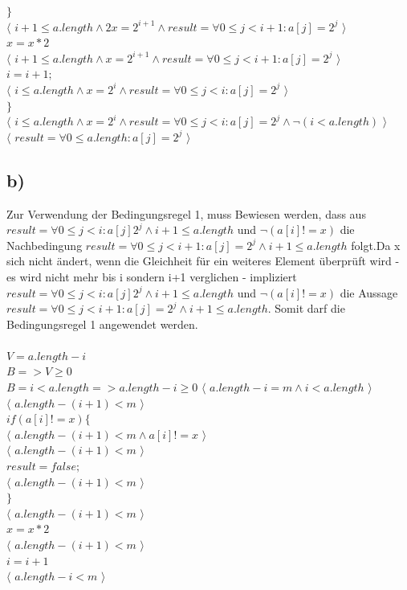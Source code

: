 \documentclass[a4paper]{article}
\begin{document}
$\}$\\
$\langle$ $i + 1 \leq a.length \land 2x=2^{i + 1} \land result = \forall 0 \leq j < i + 1: a[j] = 2^j$ $\rangle$\\
$x = x * 2$\\
$\langle$ $i + 1 \leq a.length \land x=2^{i + 1} \land result = \forall 0 \leq j < i + 1: a[j] = 2^j$ $\rangle$\\
$i = i + 1;$ \\
$\langle$ $i \leq a.length \land x=2^{i} \land result = \forall 0 \leq j < i: a[j] = 2^j$ $\rangle$\\
$\}$\\
$\langle$ $i \leq a.length \land x=2^{i} \land result = \forall 0 \leq j < i: a[j] = 2^j \land \neg (i < a.length)$ $\rangle$\\
$\langle$ $result = \forall 0 \leq a.length : a[j] = 2^j $ $\rangle$\\

\subsection*{b)}

Zur Verwendung der Bedingungsregel 1, muss Bewiesen werden, dass aus $result = \forall 0\leq j < i:a[j]2^j\land i + 1 \leq a.length$ und $\neg(a[i]!=x)$ die Nachbedingung $result = \forall 0 \leq j < i+1:a[j]=2^j\land i + 1 \leq a.length$ folgt.Da x sich nicht ändert, wenn die Gleichheit für ein weiteres Element überprüft wird - es wird nicht mehr bis i sondern i+1 verglichen - impliziert $result = \forall 0\leq j < i:a[j]2^j\land i + 1 \leq a.length$ und $\neg(a[i]!=x)$ die Aussage $result = \forall 0 \leq j < i+1:a[j]=2^j\land i + 1 \leq a.length$. Somit darf die Bedingungsregel 1 angewendet werden. \\\\
$V=a.length-i$\\
$B=>V\geq0$\\
$B=i<a.length => a.length-i \geq 0$
$\langle$ $a.length-i=m \land i<a.length$ $\rangle$\\
$\langle$ $a.length-(i+1) < m$ $\rangle$\\
$if(a[i]!=x)\{$\\
$\langle$ $a.length-(i+1)<m\land a[i]!=x$ $\rangle$\\
$\langle$ $a.length-(i+1)<m$ $\rangle$\\
$result = false;$\\
$\langle$ $a.length-(i+1)<m$ $\rangle$\\
$\}$\\
$\langle$ $a.length-(i+1)<m$ $\rangle$\\
$x=x*2$\\
$\langle$ $a.length-(i+1)<m$ $\rangle$\\
$i=i+1$\\
$\langle$ $a.length-i<m$ $\rangle$\\
\end{document}
